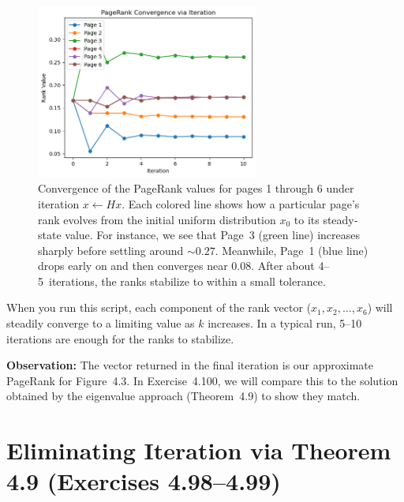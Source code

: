 \documentclass{article}
\begin{document}
\begin{figure}[h]
      \centering
      \includegraphics[width=0.65\textwidth]{img/PageRank Convergence via Iteration.png}
      \caption{%
        Convergence of the PageRank values for pages 1 through 6 under iteration 
        \(x \leftarrow Hx\). Each colored line shows how a particular page's rank 
        evolves from the initial uniform distribution \(x_0\) to its steady‐state 
        value. For instance, we see that Page~3 (green line) increases sharply 
        before settling around \(\sim 0.27\). 
        Meanwhile, Page~1 (blue line) drops early on and then converges near \(0.08\). 
        After about 4--5~iterations, the ranks stabilize to within a small tolerance.
      }
      \label{fig:pagerank-convergence}
\end{figure}

\noindent
When you run this script, each component of the rank vector 
(\(x_1, x_2, \ldots, x_6\)) will steadily converge to a limiting value 
as \(k\) increases. In a typical run, 5--10 iterations are enough for 
the ranks to stabilize.
    

\bigskip
\noindent
\textbf{Observation:} The vector returned in the final iteration is our 
approximate PageRank for Figure~4.3. In Exercise~4.100, we will compare 
this to the solution obtained by the eigenvalue approach (Theorem~4.9) 
to show they match.

\newpage

\section{Eliminating Iteration via Theorem 4.9 (Exercises 4.98--4.99)}
\end{document}
